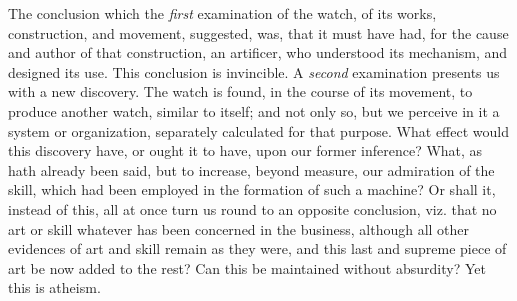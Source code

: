 The conclusion which the \textit{first} examination of the watch, of
its works, construction, and movement, suggested, was, that it must
have had, for the cause and author of that construction, an artificer,
who understood its  mechanism, and designed its use. This
conclusion is invincible. A \textit{second} examination presents us
with a new discovery. The watch is found, in the course of its
movement, to produce another watch, similar to itself; and not only
so, but we perceive in it a system or organization, separately
calculated for that purpose. What effect would this discovery have, or
ought it to have, upon our former inference? What, as hath already
been said, but to increase, beyond measure, our admiration of the
skill, which had been employed in the formation of such a machine? Or
shall it, instead of this, all at once turn us round to an opposite
conclusion, viz. that no art or skill whatever has been concerned in
the business, although all other evidences of art and skill remain as
they were, and this last and supreme piece of art be now added to the
rest? Can this be maintained without absurdity? Yet this is atheism.

